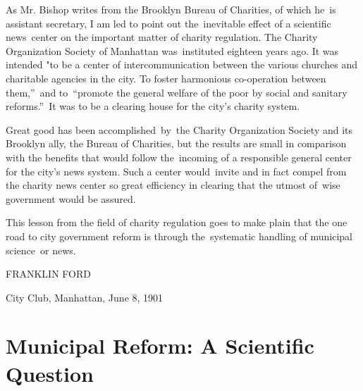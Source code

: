 \documentclass[openany,nobib]{tufte-book}
\let\oldchapter\chapter
\def\chapter{%
  \setcounter{footnote}{0}%
  \oldchapter
}
\begin{document}
As Mr. Bishop writes from the Brooklyn Bureau of Charities, of which
he~is assistant secretary, I am led to point out the~inevitable effect
of a scientific news~center on the important matter of charity
regulation. The Charity Organization Society of Manhattan was~instituted
eighteen years ago. It was intended "to be a center of
intercommunication between the various churches and charitable agencies
in the city. To foster harmonious co-operation between them,''~and
to~``promote the general welfare of the poor by social and sanitary
reforms.''~It was to be a clearing house for the city's charity system.~

Great good has been accomplished~by~the Charity Organization Society and
its Brooklyn ally, the Bureau of Charities, but the results are small in
comparison with the benefits that would follow the~incoming of a
responsible general center for the city's news system. Such a center
would~invite and in fact compel from the charity news center so great
efficiency in clearing that the utmost of~wise government would be
assured.~

This lesson from the field of charity regulation goes to make plain that
the one road to city government reform is through the~systematic
handling of municipal science~or news. ~

\vspace{0.15in}

\hfill{\Large FRANKLIN FORD}

\vspace{0.1in}

{\large City Club, Manhattan, June 8, 1901}


\chapter[Municipal Reform: A Scientific Question]{Municipal Reform: A Scientific Question}
\label{ch:Municipal Reform: A Scientific Question}

\vspace{.2in}

\begin{LARGE}


\end{LARGE}
\end{document}
